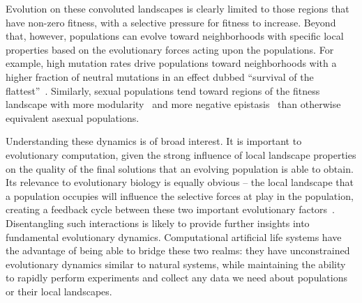 \documentclass[10pt,letterpaper]{article}
\begin{document}
Evolution on these convoluted landscapes is clearly limited to those regions that have non-zero fitness, with a selective pressure for fitness to increase. Beyond that, however, populations can evolve toward neighborhoods with specific local properties based on the evolutionary forces acting upon the populations. For example, high mutation rates drive populations toward neighborhoods with a higher fraction of neutral mutations in an effect dubbed “survival of the flattest”~\cite{wilke_evolution_2001}. Similarly, sexual populations tend toward regions of the fitness landscape with more modularity~\cite{misevic_sexual_2006} and more negative epistasis~\cite{misevic_experiments_2010} than otherwise equivalent asexual populations.

Understanding these dynamics is of broad interest. It is important to evolutionary computation, given the strong influence of local landscape properties on the quality of the final solutions that an evolving population is able to obtain. Its relevance to evolutionary biology is equally obvious -- the local landscape that a population occupies will influence the selective forces at play in the population, creating a feedback cycle between these two important evolutionary factors~\cite{zaman_coevolution_2014,meyer_repeatability_2012,martin_fitness_2006,kvitek_reciprocal_2011}. Disentangling such interactions is likely to provide further insights into fundamental evolutionary dynamics. Computational artificial life systems have the advantage of being able to bridge these two realms: they have unconstrained evolutionary dynamics similar to natural systems, while maintaining the ability to rapidly perform experiments and collect any data we need about populations or their local landscapes.
%
%
%
%
%
%
\end{document}
